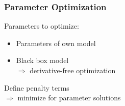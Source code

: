 \begin{frame}
\frametitle{Parameter Optimization}
Parameters to optimize:
\begin{itemize}
	\item{Parameters of own model}
	\item{Black box model \\
		$\Rightarrow$ derivative-free optimization}
\end{itemize}

\vspace{0.5cm}

Define penalty terms \\
$\Rightarrow$ minimize for parameter solutions

\end{frame}

